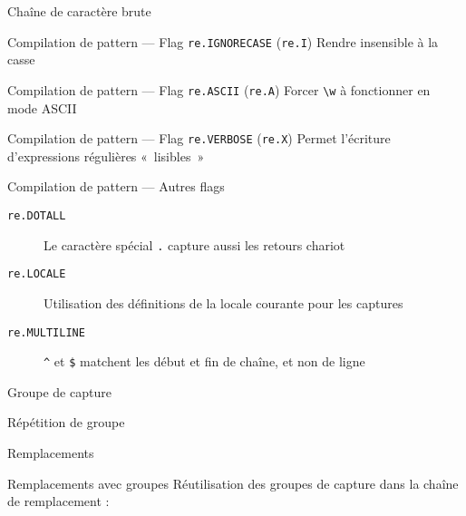 \begin{frame}{Chaîne de caractère brute}
\end{frame}

\begin{frame}{Compilation de pattern --- Flag \texttt{re.IGNORECASE} (\texttt{re.I})}
  Rendre insensible à la casse
\end{frame}

\begin{frame}{Compilation de pattern --- Flag \texttt{re.ASCII} (\texttt{re.A})}
  Forcer \texttt{\textbackslash w} à fonctionner en mode ASCII
\end{frame}

\begin{frame}{Compilation de pattern --- Flag \texttt{re.VERBOSE} (\texttt{re.X})}
  Permet l'écriture d'expressions régulières «~lisibles~»
\end{frame}

\begin{frame}{Compilation de pattern --- Autres flags}
  \begin{description}
  \item[\texttt{re.DOTALL}] Le caractère spécial \texttt{.} capture aussi les retours chariot
  \item[\texttt{re.LOCALE}] Utilisation des définitions de la locale courante pour les captures
  \item[\texttt{re.MULTILINE}] \texttt{\^{}} et \texttt{\$} matchent les début et fin de chaîne, et non de ligne
  \end{description}
\end{frame}

\begin{frame}{Groupe de capture}
\end{frame}

\begin{frame}{Répétition de groupe}
\end{frame}

\begin{frame}{Remplacements}
\end{frame}

\begin{frame}{Remplacements avec groupes}
  Réutilisation des groupes de capture dans la chaîne de remplacement :
\end{frame}

